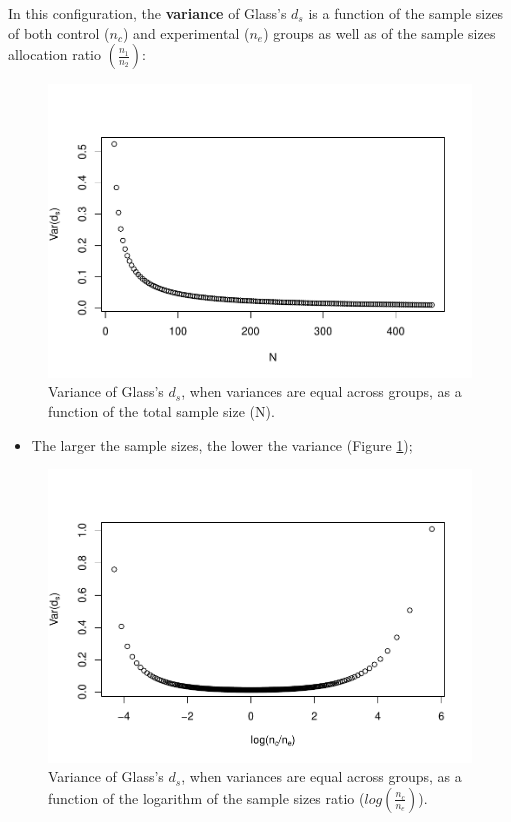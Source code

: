 \documentclass[
  man]{apa6}
\providecommand{\tightlist}{%
  \setlength{\itemsep}{0pt}\setlength{\parskip}{0pt}}
\begin{document}
In this configuration, the \textbf{variance} of Glass's \(d_s\) is a function of the sample sizes of both control (\(n_c\)) and experimental (\(n_e\)) groups as well as of the sample sizes allocation ratio \(\left( \frac{n_1}{n_2}\right)\):

\begin{figure}
\centering
\includegraphics{Theoretical-Variance-of-all-estimators-as-a-function-of-population-parameters_files/figure-latex/varglassNsize2-1.pdf}
\caption{\label{fig:varglassNsize2}Variance of Glass's \(d_s\), when variances are equal across groups, as a function of the total sample size (N).}
\end{figure}

\begin{itemize}
\tightlist
\item
  The larger the sample sizes, the lower the variance (Figure \ref{fig:varglassNsize2});
\end{itemize}

\begin{figure}
\centering
\includegraphics{Theoretical-Variance-of-all-estimators-as-a-function-of-population-parameters_files/figure-latex/varglasshomNratio2-1.pdf}
\caption{\label{fig:varglasshomNratio2}Variance of Glass's \(d_s\), when variances are equal across groups, as a function of the logarithm of the sample sizes ratio (\(log\left(\frac{n_c}{n_e} \right)\)).}
\end{figure}
\end{document}
